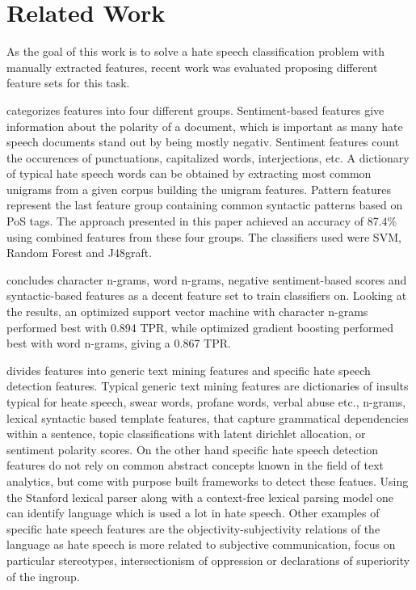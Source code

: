 \newpage
\section{Related Work} \label{related_work}

As the goal of this work is to solve a hate speech classification problem with manually extracted features, recent work was evaluated proposing different feature sets for this task. 

\cite{Watanabe2018} categorizes features into four different groups. Sentiment-based fea\-tures give information about the polarity of a document, which is important as many hate speech documents stand out by being mostly negativ. Sentiment features count the occurences of punctuations, capitalized words, interjections, etc. A dictionary of typical hate speech words can be obtained by extracting most common unigrams from a given corpus building the unigram features. Pattern features represent the last feature group containing common syntactic patterns based on PoS tags. The approach presented in this paper achieved an accuracy of 87.4\% using combined features from these four groups. The classifiers used were SVM, Random Forest and J48graft.

\cite{Oriola2020} concludes character n-grams, word n-grams, negative sentiment-based scores and syntactic-based features as a decent feature set to train classifiers on. Looking at the results, an optimized support vector machine with character n-grams performed best with 0.894 TPR, while optimized gradient boosting performed best with word n-grams, giving a 0.867 TPR. 

\cite{Fortuna2018} divides features into generic text mining features and specific hate speech detection features. Typical generic text mining features are dictionaries of insults typical for heate speech, swear words, profane words, verbal abuse etc., n-grams, lexical syntactic based template features, that capture gram\-mat\-i\-cal dependencies within a sentence, topic classifications with latent dirich\-let allocation, or sentiment polarity scores. On the other hand specific hate speech detection features do not rely on common abstract concepts known in the field of text analytics, but come with purpose built frameworks to detect these featues. Using the Stanford lexical parser along with a context-free lexical parsing model one can identify language which is used a lot in hate speech. Other examples of specific hate speech features are the objectivity-subjectivity relations of the language as hate speech is more related to subjective communication, focus on particular stereotypes, in\-ter\-sec\-tion\-ism of oppression or declarations of superiority of the ingroup. 

